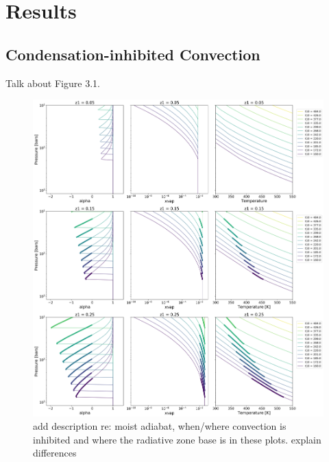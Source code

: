 \documentclass[11pt]{ucscthesisbs}
\begin{document}



\chapter{Results}

\section{Condensation-inhibited Convection}
Talk about Figure 3.1.
\begin{figure}[ht!]
 \centerline{
  \includegraphics[width=7.0in]{figures/convection_inhibited_2.png}
 }
\caption[Inhibition of convection on Uranus]
{add description re: moist adiabat, when/where convection is inhibited and where the radiative zone base is in these plots. explain differences}
\label{fig:convection_inhibited}
\end{figure}
\end{document}
